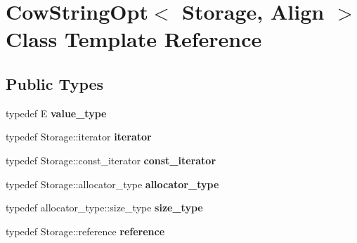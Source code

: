 \hypertarget{classCowStringOpt}{}\section{Cow\+String\+Opt$<$ Storage, Align $>$ Class Template Reference}
\label{classCowStringOpt}
\subsection*{Public Types}
\begin{DoxyCompactItemize}
\item 
\hypertarget{classCowStringOpt_ae4fa4407d115be25c62d80ff8931ed63}{}typedef E {\bfseries value\+\_\+type}\label{classCowStringOpt_ae4fa4407d115be25c62d80ff8931ed63}

\item 
\hypertarget{classCowStringOpt_a4c04075fa02e7803db40a3153a783dbe}{}typedef Storage\+::iterator {\bfseries iterator}\label{classCowStringOpt_a4c04075fa02e7803db40a3153a783dbe}

\item 
\hypertarget{classCowStringOpt_aa841103330682e09f7c6d71323ccf26c}{}typedef Storage\+::const\+\_\+iterator {\bfseries const\+\_\+iterator}\label{classCowStringOpt_aa841103330682e09f7c6d71323ccf26c}

\item 
\hypertarget{classCowStringOpt_a42b89f32442a6deb863355b396bb7e2b}{}typedef Storage\+::allocator\+\_\+type {\bfseries allocator\+\_\+type}\label{classCowStringOpt_a42b89f32442a6deb863355b396bb7e2b}

\item 
\hypertarget{classCowStringOpt_ae2f09abc755262204704f145491f6a6b}{}typedef allocator\+\_\+type\+::size\+\_\+type {\bfseries size\+\_\+type}\label{classCowStringOpt_ae2f09abc755262204704f145491f6a6b}

\item 
\hypertarget{classCowStringOpt_a63f690a3961a8392dee3acd47dbf5360}{}typedef Storage\+::reference {\bfseries reference}\label{classCowStringOpt_a63f690a3961a8392dee3acd47dbf5360}

\end{DoxyCompactItemize}
